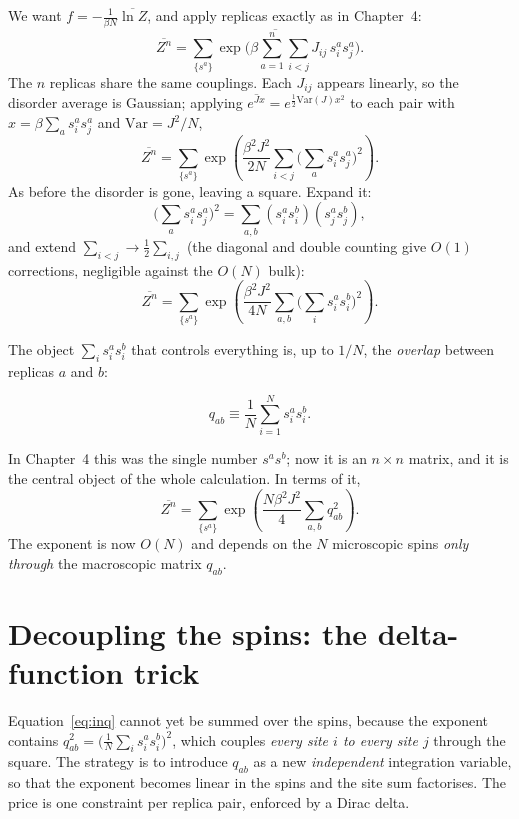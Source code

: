 \documentclass[nobib,justified]{tufte-handout}
\newcommand{\dbar}[1]{\overline{#1}}
\begin{document}
We want $f=-\frac{1}{\beta N}\dbar{\ln Z}$, and apply replicas exactly as
in Chapter~4:
\[
  \dbar{Z^n}
  = \dbar{\sum_{\{s^a\}}\exp\!\Big(\beta\sum_{a=1}^n\sum_{i<j}
    J_{ij}\,s_i^a s_j^a\Big)}.
\]
The $n$ replicas share the same couplings. Each $J_{ij}$ appears linearly,
so the disorder average is Gaussian; applying
$\dbar{e^{Jx}}=e^{\frac12\mathrm{Var}(J)x^2}$ to each pair with
$x=\beta\sum_a s_i^a s_j^a$ and $\mathrm{Var}=J^2/N$,
\begin{equation}\label{eq:square}
  \dbar{Z^n}
  = \sum_{\{s^a\}}\exp\!\left(\frac{\beta^2 J^2}{2N}
    \sum_{i<j}\Big(\sum_a s_i^a s_j^a\Big)^2\right).
\end{equation}
As before the disorder is gone, leaving a square. Expand it:
\[
  \Big(\sum_a s_i^a s_j^a\Big)^2
  = \sum_{a,b} (s_i^a s_i^b)(s_j^a s_j^b),
\]
and extend $\sum_{i<j}\to\frac12\sum_{i,j}$ (the diagonal and double
counting give $O(1)$ corrections, negligible against the $O(N)$ bulk):
\begin{equation}\label{eq:beforeq}
  \dbar{Z^n}
  = \sum_{\{s^a\}}\exp\!\left(\frac{\beta^2 J^2}{4N}
    \sum_{a,b}\Big(\sum_i s_i^a s_i^b\Big)^2\right).
\end{equation}

 The object $\sum_i s_i^a s_i^b$ that
controls everything is, up to $1/N$, the \emph{overlap} between replicas
$a$ and $b$:
\begin{keyresult}
\[
  q_{ab}\equiv\frac1N\sum_{i=1}^N s_i^a s_i^b .
\]
\end{keyresult}
\noindent
In Chapter~4 this was the single number $s^a s^b$; now it is an $n\times n$
matrix, and it is the central object of the whole calculation. In terms of
it,
\begin{equation}\label{eq:inq}
  \dbar{Z^n}
  = \sum_{\{s^a\}}\exp\!\left(\frac{N\beta^2 J^2}{4}
    \sum_{a,b} q_{ab}^2\right).
\end{equation}
The exponent is now $O(N)$ and depends on the $N$ microscopic spins
\emph{only through} the macroscopic matrix $q_{ab}$.

\section{Decoupling the spins: the delta-function trick}
\label{sec:delta}

Equation~\eqref{eq:inq} cannot yet be summed over the spins, because the
exponent contains $q_{ab}^2=\big(\frac1N\sum_i s_i^a s_i^b\big)^2$, which
couples \emph{every site $i$ to every site $j$} through the square. The
strategy is to introduce $q_{ab}$ as a new \emph{independent} integration
variable, so that the exponent becomes linear in the spins and the site
sum factorises. The price is one constraint per replica pair, enforced by a
Dirac delta.
\end{document}
